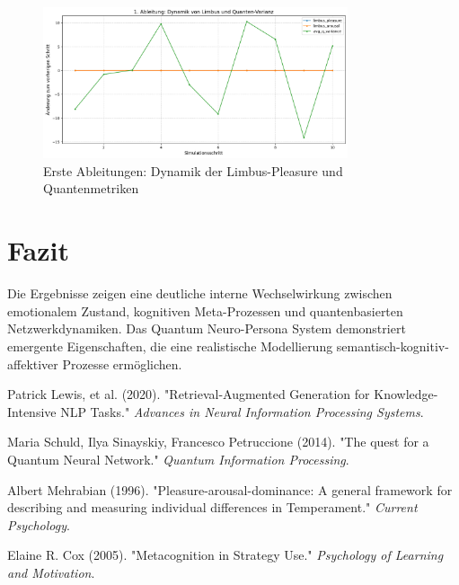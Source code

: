 \documentclass[11pt,a4paper]{article}
\begin{document}
\begin{figure}[H]
    \centering
    \includegraphics[width=0.8\textwidth]{derivatives_timeseries.png}
    \caption{Erste Ableitungen: Dynamik der Limbus-Pleasure und Quantenmetriken}
    \label{fig:derivatives}
\end{figure}

\section{Fazit}
\label{sec:fazit}

Die Ergebnisse zeigen eine deutliche interne Wechselwirkung zwischen emotionalem Zustand, kognitiven Meta-Prozessen und quantenbasierten Netzwerkdynamiken. Das Quantum Neuro-Persona System demonstriert emergente Eigenschaften, die eine realistische Modellierung semantisch-kognitiv-affektiver Prozesse ermöglichen.

\begin{thebibliography}{9}

Patrick Lewis, et al. (2020). "Retrieval-Augmented Generation for Knowledge-Intensive NLP Tasks." \emph{Advances in Neural Information Processing Systems}.

Maria Schuld, Ilya Sinayskiy, Francesco Petruccione (2014). "The quest for a Quantum Neural Network." \emph{Quantum Information Processing}.

Albert Mehrabian (1996). "Pleasure-arousal-dominance: A general framework for describing and measuring individual differences in Temperament." \emph{Current Psychology}.

Elaine R. Cox (2005). "Metacognition in Strategy Use." \emph{Psychology of Learning and Motivation}.

\end{thebibliography}
\end{document}
